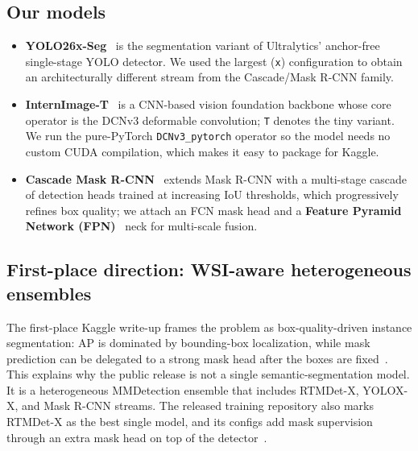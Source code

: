 \documentclass[12pt, a4paper]{article}
\begin{document}
\subsection{Our models}

\begin{itemize}
    \item \textbf{YOLO26x-Seg}~\cite{ultralytics} is the segmentation variant of Ultralytics' anchor-free single-stage YOLO detector. We used the largest (\texttt{x}) configuration to obtain an architecturally different stream from the Cascade/Mask R-CNN family.
    \item \textbf{InternImage-T}~\cite{internimage} is a CNN-based vision foundation backbone whose core operator is the DCNv3 deformable convolution; \texttt{T} denotes the tiny variant. We run the pure-PyTorch \texttt{DCNv3\_pytorch} operator so the model needs no custom CUDA compilation, which makes it easy to package for Kaggle.
    \item \textbf{Cascade Mask R-CNN}~\cite{cascade_rcnn,maskrcnn} extends Mask R-CNN with a multi-stage cascade of detection heads trained at increasing IoU thresholds, which progressively refines box quality; we attach an FCN mask head and a \textbf{Feature Pyramid Network (FPN)}~\cite{fpn} neck for multi-scale fusion.
\end{itemize}

\subsection{First-place direction: WSI-aware heterogeneous ensembles}

The first-place Kaggle write-up frames the problem as box-quality-driven instance segmentation: AP is dominated by bounding-box localization, while mask prediction can be delegated to a strong mask head after the boxes are fixed~\cite{tascj2023hubmapfirst}. This explains why the public release is not a single semantic-segmentation model. It is a heterogeneous MMDetection ensemble that includes RTMDet-X, YOLOX-X, and Mask R-CNN streams. The released training repository also marks RTMDet-X as the best single model, and its configs add mask supervision through an extra mask head on top of the detector~\cite{tascj2023hubmapfirst}.
\end{document}

